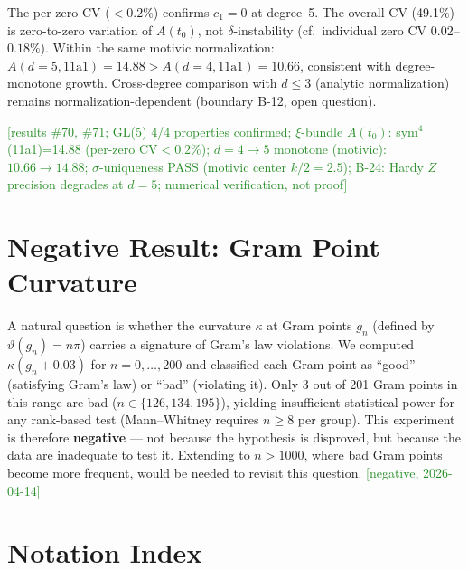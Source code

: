 \documentclass[11pt, a4paper]{article}
\theoremstyle{definition}
\theoremstyle{plain}
\begin{document}
\noindent
The per-zero CV ($< 0.2\%$) confirms $c_1 = 0$ at degree~5.
The overall CV (49.1\%) is zero-to-zero variation of $A(t_0)$, not $\delta$-instability
(cf.\ individual zero CV $0.02$--$0.18\%$).
Within the same motivic normalization: $A(d{=}5, 11\mathrm{a}1) = 14.88 > A(d{=}4, 11\mathrm{a}1) = 10.66$,
consistent with degree-monotone growth.
Cross-degree comparison with $d \leq 3$ (analytic normalization) remains
normalization-dependent (boundary B-12, open question).

\textcolor{ForestGreen}{[results \#70, \#71; GL(5) 4/4 properties confirmed;
$\xi$-bundle $A(t_0)$: sym$^4$(11a1)=14.88 (per-zero CV${<}0.2\%$);
$d{=}4{\to}5$ monotone (motivic): $10.66{\to}14.88$;
$\sigma$-uniqueness PASS (motivic center $k/2{=}2.5$);
B-24: Hardy $Z$ precision degrades at $d{=}5$;
numerical verification, not proof]}


\section{Negative Result: Gram Point Curvature}
\label{app:gram_negative}

A natural question is whether the curvature $\kappa$ at Gram points
$g_n$ (defined by $\vartheta(g_n) = n\pi$) carries a signature of
Gram's law violations. We computed $\kappa(g_n + 0.03)$ for
$n = 0, \ldots, 200$ and classified each Gram point as ``good''
(satisfying Gram's law) or ``bad'' (violating it). Only 3 out of 201
Gram points in this range are bad ($n \in \{126, 134, 195\}$),
yielding insufficient statistical power for any rank-based test
(Mann--Whitney requires $n \geq 8$ per group). This experiment is
therefore \textbf{negative} --- not because the hypothesis is
disproved, but because the data are inadequate to test it.
Extending to $n > 1000$, where bad Gram points become more frequent,
would be needed to revisit this question.
\textcolor{ForestGreen}{[negative, 2026-04-14]}


\section{Notation Index}
\label{app:notation}
\end{document}
